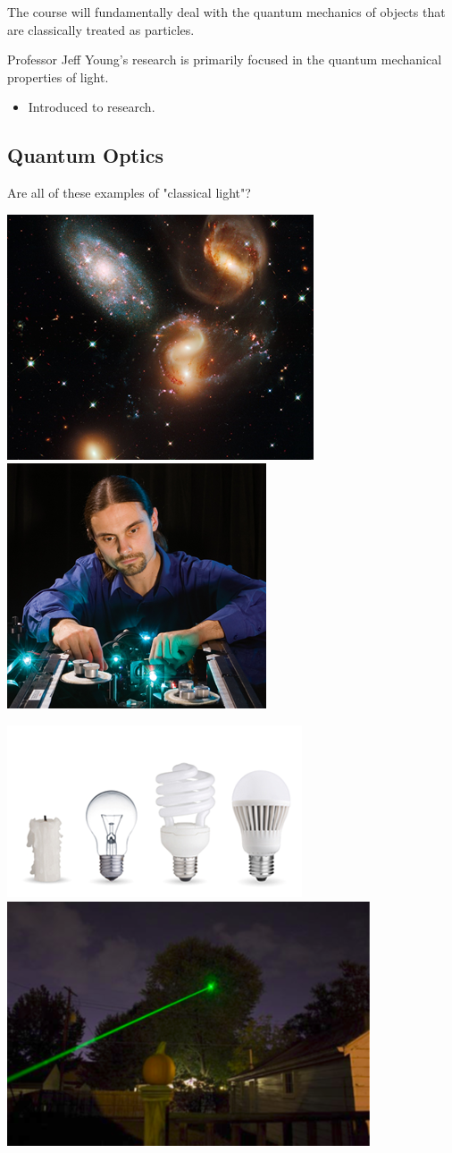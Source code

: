 \documentclass{article}
\begin{document}
The course will fundamentally deal with the quantum mechanics of objects that are classically treated as particles. 

Professor Jeff Young's research is primarily focused in the quantum mechanical properties of light. 

\begin{itemize}
    \item Introduced to research. 
\end{itemize}

\subsection{Quantum Optics}

Are all of these examples of "classical light"?

\includegraphics[width = 0.5 \textwidth]{Lecture01/1.png}
\includegraphics[width = 0.5 \textwidth]{Lecture01/2.png}


\includegraphics[width = 0.5 \textwidth]{Lecture01/3.png}
\includegraphics[width = 0.5 \textwidth]{Lecture01/4.png}
\end{document}
